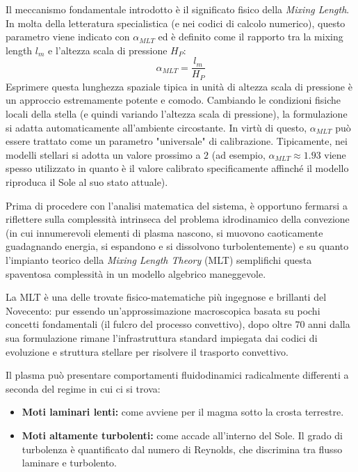 Il meccanismo fondamentale introdotto è il significato fisico della \textit{Mixing Length}. In molta della letteratura specialistica (e nei codici di calcolo numerico), questo parametro viene indicato con $\alpha_{MLT}$ ed è definito come il rapporto tra la mixing length $l_m$ e l'altezza scala di pressione $H_P$:
\begin{equation}
\alpha_{MLT} = \frac{l_m}{H_P}
\end{equation}
Esprimere questa lunghezza spaziale tipica in unità di altezza scala di pressione è un approccio estremamente potente e comodo. Cambiando le condizioni fisiche locali della stella (e quindi variando l'altezza scala di pressione), la formulazione si adatta automaticamente all'ambiente circostante. In virtù di questo, $\alpha_{MLT}$ può essere trattato come un parametro "universale" di calibrazione. Tipicamente, nei modelli stellari si adotta un valore prossimo a $2$ (ad esempio, $\alpha_{MLT} \approx 1.93$ viene spesso utilizzato in quanto è il valore calibrato specificamente affinché il modello riproduca il Sole al suo stato attuale).

Prima di procedere con l'analisi matematica del sistema, è opportuno fermarsi a riflettere sulla complessità intrinseca del problema idrodinamico della convezione (in cui innumerevoli elementi di plasma nascono, si muovono caoticamente guadagnando energia, si espandono e si dissolvono turbolentemente) e su quanto l'impianto teorico della \textit{Mixing Length Theory} (MLT) semplifichi questa spaventosa complessità in un modello algebrico maneggevole.

La MLT è una delle trovate fisico-matematiche più ingegnose e brillanti del Novecento: pur essendo un'approssimazione macroscopica basata su pochi concetti fondamentali (il fulcro del processo convettivo), dopo oltre $70$ anni dalla sua formulazione rimane l'infrastruttura standard impiegata dai codici di evoluzione e struttura stellare per risolvere il trasporto convettivo.

Il plasma può presentare comportamenti fluidodinamici radicalmente differenti a seconda del regime in cui ci si trova:
\begin{itemize}
\item \textbf{Moti laminari lenti:} come avviene per il magma sotto la crosta terrestre.
\item \textbf{Moti altamente turbolenti:} come accade all'interno del Sole. Il grado di turbolenza è quantificato dal numero di Reynolds, che discrimina tra flusso laminare e turbolento.
\end{itemize}

